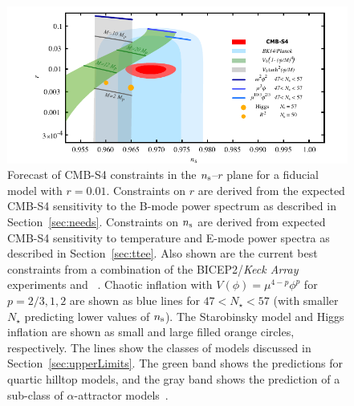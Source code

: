 \begin{figure}[ht]
\begin{center}
\includegraphics[width=6in]{Inflation/nsrlabeledrp01v10s}
\end{center}
\caption{Forecast of CMB-S4 constraints in the $n_{\rm s}$--$r$ plane for a fiducial model with $r=0.01$. Constraints 
on $r$ are derived from the expected CMB-S4 sensitivity to the B-mode power spectrum as described in 
Section~\ref{sec:needs}. Constraints on $n_{\rm s}$ are derived from expected CMB-S4 sensitivity to temperature and 
E-mode power spectra as described in Section~\ref{sec:ttee}. Also shown are the current best constraints from a combination of the { BICEP}2/{\em Keck Array} experiments and \planck\ \cite{Array:2015xqh}. Chaotic inflation with $V(\phi)=\mu^{4-p}\phi^p$ for \mbox{$p=2/3,1,2$} are shown as blue lines for $47<N_\star<57$ (with smaller $N_\star$ predicting lower values of $n_{\rm s}$). The Starobinsky model and Higgs inflation are shown as small and large filled orange circles, respectively. The lines show the classes of models discussed in Section~\ref{sec:upperLimits}. The green band shows the predictions for quartic hilltop models, and the gray band shows the prediction of a sub-class of $\alpha$-attractor models~\cite{Kallosh:2013hoa}.
}
\label{fig:nsrp01}
\end{figure}
 

